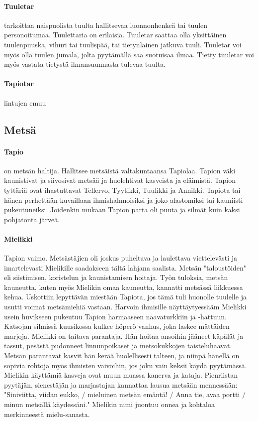   \paragraph{Tuuletar} tarkoittaa naispuolista tuulta hallitsevaa luonnonhenkeä tai tuulen 
    personoitumaa. Tuulettaria on erilaisia. Tuuletar saattaa olla yksittäinen tuulenpuuska, 
    vihuri tai tuulispää, tai tietynlainen jatkuva tuuli. Tuuletar voi myös olla tuulen jumala, 
    jolta pyytämällä saa suotuisaa ilmaa. Tietty tuuletar voi myös vastata tietystä 
    ilmansuunnasta tulevaa tuulta.
  \paragraph{Tapiotar} lintujen emuu 



\subsection{Metsä}

  \paragraph{Tapio} on metsän haltija. Hallitsee metsäistä valtakuntaansa Tapiolaa. Tapion väki 
    kaunistivat ja siivosivat metsää ja huolehtivat kasveista ja eläimistä. Tapion tyttäriä ovat 
    ihastuttavat Tellervo, Tyytikki, Tuulikki ja Annikki. Tapiota tai hänen perhettään 
    kuvaillaan ihmishahmoisiksi ja joko alastomiksi tai kauniisti pukeutuneiksi. Joidenkin mukaan 
    Tapion parta oli puuta ja silmät kuin kaksi pohjatonta järveä.  
  \paragraph{Mielikki} Tapion vaimo. Metsästäjien oli joskus puheltava ja laulettava 
    viettelevästi ja imartelevasti Mielikille saadakseen tältä lahjana saalista. Metsän 
    "taloustöiden" eli siistimisen, koristelun ja kaunistamisen hoitaja. Työn tuloksia, metsän 
    kauneutta, kuten myös Mielikin omaa kauneutta, kannatti metsässä liikkuessa kehua. Uskottiin 
    lepyttävän miestään Tapiota, jos tämä tuli huonolle tuulelle ja usutti voimat metsämiehiä 
    vastaan. Harvoin ihmisille näyttäytyessääm Mielikki usein huvikseen pukeutuu Tapion 
    harmaaseen naavaturkkiin ja -hattuun. Katsojan silmissä kuusikossa kulkee höperö vanhus, 
    joka laskee mättäiden marjoja.  Mielikki on taitava parantaja. Hän hoitaa ansoihin jääneet 
    käpälät ja tassut, pesästä pudonneet linnunpoikaset ja metsokukkojen taisteluhaavat. Metsän 
    parantavat kasvit hän kerää huolellisesti talteen, ja niinpä hänellä on sopivia rohtoja 
    myös ihmisten vaivoihin, jos joku vain keksii käydä pyytämässä. Mielikin käyttämiä kasveja 
    ovat muun muassa kanerva ja kataja. Pienriistan pyytäjän, sienestäjän ja marjastajan 
    kannattaa lausua metsään mennessään: "Siniviitta, viidan eukko, / mieluinen metsän 
    emäntä! / Anna tie, avaa portti / minun metsällä käydessäni." Mielikin nimi juontuu onnea 
    ja kohtaloa merkinneestä mielu-sanasta.
